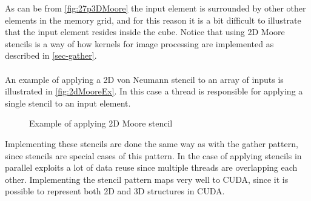As can be from \autoref{fig:27p3DMoore} the input element is surrounded by other other elements in the memory grid, and for this reason it is a bit difficult to illustrate that the input element resides inside the cube.
Notice that using 2D Moore stencils is a way of how kernels for image processing are implemented as described in \autoref{sec-gather}.
\\\\
An example of applying a 2D von Neumann stencil to an array of inputs is illustrated in \autoref{fig:2dMooreEx}.
In this case a thread is responsible for applying a single stencil to an input element.
\begin{figure}[ht]
	\centering
	\caption{Example of applying 2D Moore stencil}
	\label{fig:2dMooreEx}
\end{figure}
Implementing these stencils are done the same way as with the gather pattern, since stencils are special cases of this pattern.
In the case of applying stencils in parallel exploits a lot of data reuse since multiple threads are overlapping each other.
Implementing the stencil pattern maps very well to CUDA, since it is possible to represent both 2D and 3D structures in CUDA.